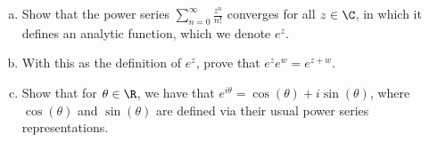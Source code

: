 \documentclass[10pt]{mypackage}
\begin{document}
\RaggedRight
\begin{problem}\hfill
  \begin{enumerate}[(a)]
    \item Show that the power series $\sum_{n=0}^{\infty}\frac{z^{n}}{n!}$ converges for all $z\in \C$, in which it defines an analytic function, which we denote $e^{z}$.
    \item With this as the definition of $e^{z}$, prove that $e^{z}e^{w} = e^{z+w}$.
    \item Show that for $\theta\in \R$, we have that $e^{i\theta} = \cos\left( \theta \right) + i\sin\left( \theta \right)$, where $\cos\left( \theta \right)$ and $\sin\left( \theta \right)$ are defined via their usual power series representations.
  \end{enumerate}
\end{problem}
\end{document}
